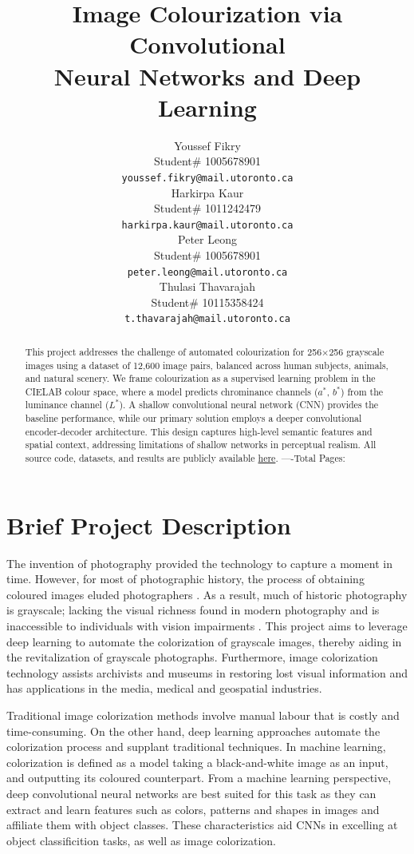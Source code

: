\documentclass{article} %
\title{Image Colourization via Convolutional \\
Neural Networks and Deep Learning}
\author{Youssef Fikry  \\
Student\# 1005678901\\
\texttt{youssef.fikry@mail.utoronto.ca} \\
\And Harkirpa Kaur  \\
Student\# 1011242479 \\
\texttt{harkirpa.kaur@mail.utoronto.ca} \\
\AND
Peter Leong \\
Student\# 1005678901 \\
\texttt{peter.leong@mail.utoronto.ca} \\
\And
Thulasi Thavarajah \\
Student\# 10115358424 \\
\texttt{t.thavarajah@mail.utoronto.ca} \\
\AND
}
\begin{document}
\maketitle

\begin{abstract}
This project addresses the challenge of automated colourization for 256$\times$256 grayscale images using a dataset of 12,600 image pairs, balanced across human subjects, 
animals, and natural scenery. We frame colourization as a supervised learning problem in the CIELAB colour space, where a model predicts chrominance channels ($a^*$, $b^*$) 
from the luminance channel ($L^*$). A shallow convolutional neural network (CNN) provides the baseline performance, while our primary solution employs a deeper convolutional encoder-decoder architecture. This 
design captures high-level semantic features and spatial context, addressing limitations of shallow networks in perceptual realism. All source code, datasets, and results 
are publicly available \href{https://drive.google.com/drive/folders/1cV1NhlQ8UTk_CgJdwhqeRu0z5xE85ZsI?usp=sharing}{here}. 
----Total Pages: \pageref{last_page}
\end{abstract}


\section{Brief Project Description}

The invention of photography provided the technology to capture a moment in time. However, for most of photographic history, the process of obtaining coloured images eluded photographers \citep{scienceandmediamuseum2020}. As a result, much of historic photography is grayscale; lacking the visual richness found in modern photography and is inaccessible to individuals with vision impairments \citep{vogelsang2024impact}. This project aims to leverage deep learning to automate the colorization of grayscale images, thereby aiding in the revitalization of grayscale photographs. Furthermore, image colorization technology assists archivists and museums in restoring lost visual information and has applications in the media, medical and geospatial industries. 

Traditional image colorization methods involve manual labour that is costly and time-consuming. On the other hand, deep learning approaches automate the colorization process and supplant traditional techniques. In machine learning, colorization is defined as a model taking a black-and-white image as an input, and outputting its coloured counterpart. From a machine learning perspective, deep convolutional neural networks are best suited for this task as they can extract and learn features such as colors, patterns and shapes in images and affiliate them with object classes. These characteristics aid CNNs in excelling at object classificition tasks, as well as image colorization. 
\end{document}
